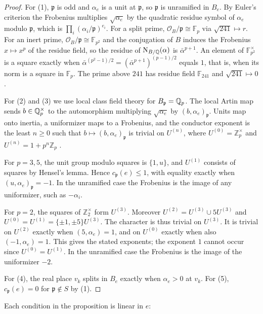 \begin{proof}
For (1), $\mathfrak p$ is odd and $\alpha_e$ is a unit at $\mathfrak p$, so
$\mathfrak p$ is unramified in $B_e$. By Euler's criterion the Frobenius
multiplies $\sqrt{\alpha_e}$ by the quadratic residue symbol of $\alpha_e$
modulo $\mathfrak p$, which is $\prod_i(\alpha_i/\mathfrak p)^{e_i}$. For a
split prime, $\mathcal O_B/\mathfrak p\cong\mathbb F_p$ via $\sqrt{241}\mapsto
r$. For an inert prime, $\mathcal O_B/\mathfrak p\cong\mathbb F_{p^2}$ and
the conjugation of $B$ induces the Frobenius $x\mapsto x^p$ of the residue
field, so the residue of $\mathrm N_{B/\mathbb Q}(\alpha)$ is $\bar\alpha^{p+1}$. An element
of $\mathbb F_{p^2}^\times$ is a square exactly when
$\bar\alpha^{(p^2-1)/2}=(\bar\alpha^{p+1})^{(p-1)/2}$ equals $1$, that is,
when its norm is a square in $\mathbb F_p$. The prime above $241$ has
residue field $\mathbb F_{241}$ and $\sqrt{241}\mapsto0$.

For (2) and (3) we use local class field theory for $B_{\mathfrak p}=\mathbb Q_p$.
The local Artin map sends $b\in\mathbb Q_p^\times$ to the automorphism multiplying
$\sqrt{\alpha_e}$ by $(b,\alpha_e)_{\mathfrak p}$. Units map onto inertia, a
uniformizer maps to a Frobenius, and the conductor exponent is the least
$n\ge0$ such that $b\mapsto(b,\alpha_e)_{\mathfrak p}$ is trivial on
$U^{(n)}$, where $U^{(0)}=\mathbb Z_p^\times$ and $U^{(n)}=1+p^n\mathbb Z_p$
\cite{MilneCFT}.

For $p=3,5$, the unit group modulo squares is $\{1,u\}$, and $U^{(1)}$
consists of squares by Hensel's lemma. Hence $c_{\mathfrak p}(e)\le1$, with
equality exactly when $(u,\alpha_e)_{\mathfrak p}=-1$. In the unramified
case the Frobenius is the image of any uniformizer, such as $-\alpha_i$.

For $p=2$, the squares of $\mathbb Z_2^\times$ form $U^{(3)}$. Moreover
$U^{(2)}=U^{(3)}\cup5U^{(3)}$ and
$U^{(0)}=U^{(1)}=\{\pm1,\pm5\}U^{(3)}$. The character is thus trivial on
$U^{(3)}$. It is trivial on $U^{(2)}$ exactly when $(5,\alpha_e)=1$, and
on $U^{(0)}$ exactly when also $(-1,\alpha_e)=1$. This gives the stated
exponents; the exponent $1$ cannot occur since $U^{(0)}=U^{(1)}$. In the
unramified case the Frobenius is the image of the uniformizer $-2$.

For (4), the real place $v_k$ splits in $B_e$ exactly when $\alpha_e>0$ at
$v_k$. For (5), $c_{\mathfrak p}(e)=0$ for $\mathfrak p\notin S$ by (1).
\end{proof}

Each condition in the proposition is linear in $e$:

